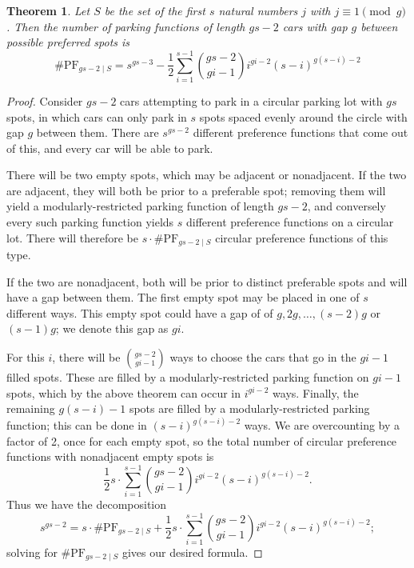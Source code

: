 \documentclass[12 pt]{amsart}
\newtheorem{theorem}{Theorem}[section]
\theoremstyle{definition} %
\theoremstyle{remark} %
\begin{document}
\begin{theorem}
	Let $S$ be the set of the first $s$ natural numbers $j$ with $j \equiv 1 \pmod g$. Then the number of parking functions of length $gs - 2$ cars with gap $g$ between possible preferred spots is
	\[
		\# \mathrm{PF}_{gs - 2 \mid S} = s^{gs - 3} - \frac{1}{2} \sum_{i = 1}^{s - 1} \binom{gs - 2}{gi - 1} i^{gi - 2}(s - i)^{g(s - i) - 2}
	\]
\end{theorem}

\begin{proof}
    Consider $gs-2$ cars attempting to park in a circular parking lot with $gs$ spots, in which cars can only park in $s$ spots spaced evenly around the circle with gap $g$ between them. There are $s^{gs-2}$ different preference functions that come out of this, and every car will be able to park.

    There will be two empty spots, which may be adjacent or nonadjacent. If the two are adjacent, they will both be prior to a preferable spot; removing them will yield a modularly-restricted parking function of length $gs-2$, and conversely every such parking function yields $s$ different preference functions on a circular lot. There will therefore be $s\cdot\# \mathrm{PF}_{gs - 2 \mid S}$ circular preference functions of this type.
    
    If the two are nonadjacent, both will be prior to distinct preferable spots and will have a gap between them. The first empty spot may be placed in one of $s$ different ways. This empty spot could have a gap of of $g,2g,\ldots,(s-2)g$ or $(s-1)g$; we denote this gap as $gi$.

    For this $i$, there will be $\binom{gs-2}{gi-1}$ ways to choose the cars that go in the $gi-1$ filled spots. These are filled by a modularly-restricted parking function on $gi-1$ spots, which by the above theorem can occur in $i^{gi-2}$ ways. Finally, the remaining $g(s-i)-1$ spots are filled by a modularly-restricted parking function; this can be done in $(s - i)^{g(s - i) - 2}$ ways. We are overcounting by a factor of 2, once for each empty spot, so the total number of circular preference functions with nonadjacent empty spots is 
    \[
        \frac{1}{2}s\cdot \sum_{i = 1}^{s - 1} \binom{gs - 2}{gi - 1} i^{gi - 2}(s - i)^{g(s - i) - 2}.
    \]
    Thus we have the decomposition 
    \[
		s^{gs - 2} = s\cdot\# \mathrm{PF}_{gs - 2 \mid S} + \frac{1}{2}s\cdot \sum_{i = 1}^{s - 1} \binom{gs - 2}{gi - 1} i^{gi - 2}(s - i)^{g(s - i) - 2};
	\]
    solving for $\# \mathrm{PF}_{gs - 2 \mid S}$ gives our desired formula.
\end{proof}
\end{document}
